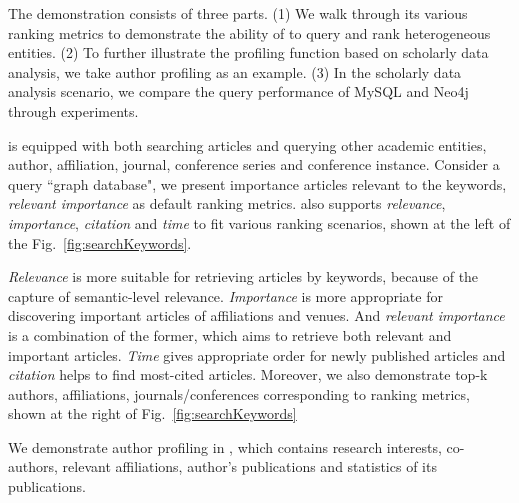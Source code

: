 The demonstration consists of three parts. (1) We walk through its various ranking metrics to demonstrate the ability of \oursystem to query and rank heterogeneous entities. (2) To further illustrate the profiling function based on scholarly data analysis, we take author profiling as an example. (3) In the scholarly data analysis scenario, we compare the query performance of MySQL and Neo4j through experiments.



\oursystem is equipped with both searching articles and querying other academic entities, \ie author, affiliation, journal, conference series and conference instance. Consider a query ``graph database", we present importance articles relevant to the keywords, {\em relevant importance} as default ranking metrics. \oursystem also supports {\em relevance}, {\em importance}, {\em citation} and {\em time} to fit various ranking scenarios, shown at the left of the Fig.~\ref{fig:searchKeywords}.

\par
{\em Relevance} is more suitable for retrieving articles by keywords, because of the capture of  semantic-level relevance. {\em Importance} is more appropriate for discovering important articles of affiliations and venues. And {\em relevant importance} is a combination of the former, which aims to retrieve both relevant and important articles. {\em Time} gives appropriate order for newly published articles and {\em citation} helps to find most-cited articles. Moreover, we also demonstrate top-k authors, affiliations, journals/conferences corresponding to ranking metrics, shown at the right of Fig.~\ref{fig:searchKeywords}


 We demonstrate author profiling in \oursystem, which contains research interests, co-authors, relevant affiliations, author's publications and statistics of its publications.

